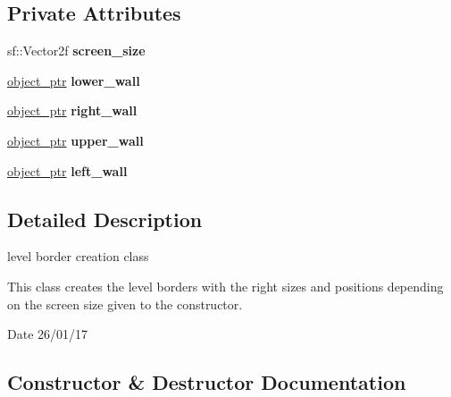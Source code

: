 \subsection*{Private Attributes}
\begin{DoxyCompactItemize}
\item 
\mbox{\label{classbase__level_a69702ca202fa2a3a4c83faaa807971c2}} 
sf\+::\+Vector2f {\bfseries screen\+\_\+size}
\item 
\mbox{\label{classbase__level_a196474637fdc953f4f2ed088ace891f7}} 
\hyperlink{typedefs_8hpp_aab5add95f06d2ba25dbfed8eb07274fa}{object\+\_\+ptr} {\bfseries lower\+\_\+wall}
\item 
\mbox{\label{classbase__level_a4a1f6a57a83aec4bd0b82072ab21df43}} 
\hyperlink{typedefs_8hpp_aab5add95f06d2ba25dbfed8eb07274fa}{object\+\_\+ptr} {\bfseries right\+\_\+wall}
\item 
\mbox{\label{classbase__level_a5e4ab9bce71cb388025305d0f20cb7bf}} 
\hyperlink{typedefs_8hpp_aab5add95f06d2ba25dbfed8eb07274fa}{object\+\_\+ptr} {\bfseries upper\+\_\+wall}
\item 
\mbox{\label{classbase__level_a29e885695d2a043bdab849dcb73c5c8e}} 
\hyperlink{typedefs_8hpp_aab5add95f06d2ba25dbfed8eb07274fa}{object\+\_\+ptr} {\bfseries left\+\_\+wall}
\end{DoxyCompactItemize}


\subsection{Detailed Description}
level border creation class 

This class creates the level borders with the right sizes and positions depending on the screen size given to the constructor.

\begin{DoxyDate}{Date}
26/01/17 
\end{DoxyDate}


\subsection{Constructor \& Destructor Documentation}
\mbox{\label{classbase__level_addf165fdc5f4e953be3b6a2dcd00459b}} 
